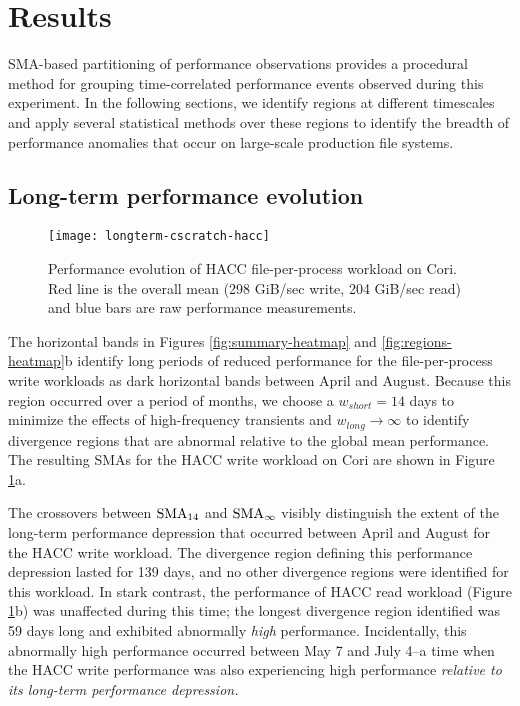\section{Results}\label{sec:results}

SMA-based partitioning of performance observations provides a procedural method for grouping time-correlated performance events observed during this experiment.
In the following sections, we identify regions at different timescales and apply several statistical methods over these regions to identify the breadth of performance anomalies that occur on large-scale production file systems.

\subsection{Long-term performance evolution} \label{sec:results/longterm}

\begin{figure}[t]
    \centering
    \texttt{[image: longterm-cscratch-hacc]}
    \vspace{-.35in}
    \caption{Performance evolution of HACC file-per-process workload on Cori.  Red line is the overall mean (298 GiB/sec write, 204 GiB/sec read) and blue bars are raw performance measurements.}
    \label{fig:timeseries-baseline}
\end{figure}

The horizontal bands in Figures \ref{fig:summary-heatmap} and \ref{fig:regions-heatmap}b identify long periods of reduced performance for the file-per-process write workloads as dark horizontal bands between April and August.
Because this region occurred over a period of months, we choose a ${w_{short}} = 14$ days to minimize the effects of high-frequency transients and ${w_{long}} \rightarrow \infty$ to identify divergence regions that are abnormal relative to the global mean performance.  The resulting SMAs for the HACC write workload on Cori are shown in Figure \ref{fig:timeseries-baseline}a.

The crossovers between $\textup{SMA}_{14}$ and $\textup{SMA}_{\infty}$ visibly distinguish the extent of the long-term performance depression that occurred between April and August for the HACC write workload.
The divergence region defining this performance depression lasted for 139 days, and no other divergence regions were identified for this workload.
In stark contrast, the performance of HACC read workload (Figure \ref{fig:timeseries-baseline}b) was unaffected during this time; the longest divergence region identified was 59 days long and exhibited abnormally \emph{high} performance.
Incidentally, this abnormally high performance occurred between May 7 and July 4--a time when the HACC write performance was also experiencing high performance \emph{relative to its long-term performance depression.}

